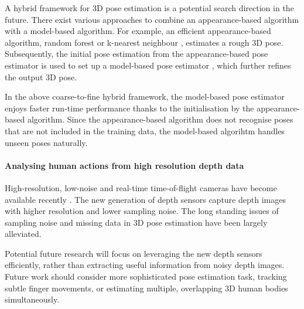 A hybrid framework for 3D pose estimation is a potential search direction in the future. There exist various approaches to combine an appearance-based algorithm with a model-based algorithm.  
For example, an efficient appearance-based algorithm, \eg random forest or k-nearest neighbour \cite{Keskin2012, Baak2011, Ye2011}, estimates a rough 3D pose. Subsequently, the initial pose estimation from the appearance-based pose estimator is used to set up a model-based pose estimator \cite{Pons-Moll2011, Sigal2012, Oikonomidis2011}, which further refines the output 3D pose.

In the above coarse-to-fine hybrid framework, the model-based pose estimator enjoys faster run-time performance thanks to the initialisation by the appearance-based algorithm. Since the appearance-based algorithm does not recognise poses that are not included in the training data, the model-based algorihtm handles unseen poses naturally.

\paragraph{Analysing human actions from high resolution depth data}

High-resolution, low-noise and real-time time-of-flight cameras have become available recently \cite{Nair2012}. 
The new generation of depth sensors capture depth images with higher resolution and lower sampling noise.  
The long standing issues of sampling noise and missing data in 3D pose estimation have been largely alleviated. 

Potential future research will focus on leveraging the new depth sensors efficiently, rather than extracting useful information from noisy depth images. 
Future work should consider more sophisticated pose estimation task, \eg tracking subtle finger movements, or estimating multiple, overlapping 3D human bodies simultaneously.    



